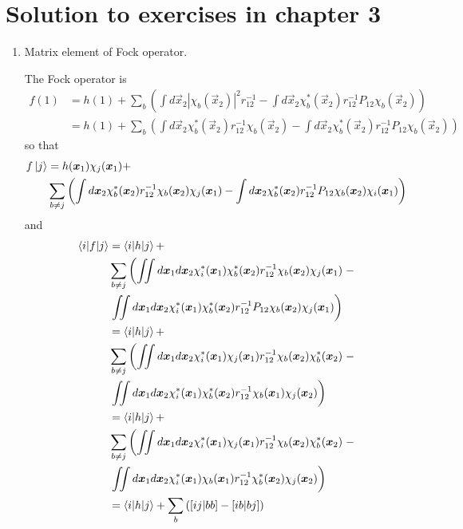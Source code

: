 \chapter{Solution to exercises in chapter 3}
\begin{enumerate}
\item\label{c3p1} Matrix element of Fock operator.

The Fock operator is
\[
\begin{aligned}
f(1) &= h(1) + \sum_b\left(\int d\vec{x}_2|\chi_b(\vec{x}_2)|^2 r_{12}^{-1} -
\int d\vec{x}_2\chi_b^\ast(\vec{x}_2)r_{12}^{-1}P_{12}\chi_b(\vec{x}_2)\right) \\
 &= h(1) + \sum_b\left(
\int d\vec{x}_2\chi_b^\ast(\vec{x}_2)r_{12}^{-1}\chi_b(\vec{x}_2) -
\int d\vec{x}_2\chi_b^\ast(\vec{x}_2)r_{12}^{-1}P_{12}\chi_b(\vec{x}_2)\right) 
\end{aligned}
\]
so that
\[
\begin{aligned}
f\ket{j} &= h(\bm{x}_1)\chi_j(\bm{x}_1) + \\
 & \sum_{b \ne j}\left(\int d\bm{x}_2
 \chi_b^\ast(\bm{x}_2)r_{12}^{-1}\chi_b(\bm{x}_2)\chi_j(\bm{x}_1) -
\int d\bm{x}_2\chi_b^\ast(\bm{x}_2)r_{12}^{-1}P_{12}\chi_b(\bm{x}_2)
\chi_i(\bm{x}_1) \right) 
\end{aligned}
\]
and
\[
\begin{aligned}
\braket{i|f|j} &= \braket{i|h|j} + \\
 & \sum_{b \ne j}\left(\iint d\bm{x}_1 d\bm{x}_2 \chi_i^\ast(\bm{x}_1)
 \chi_b^\ast(\bm{x}_2)r_{12}^{-1}\chi_b(\bm{x}_2)\chi_j(\bm{x}_1)\right. - \\
 & \left.
 \iint d\bm{x}_1 d\bm{x}_2
 \chi_i^\ast(\bm{x}_1)\chi_b^\ast(\bm{x}_2)r_{12}^{-1}P_{12}\chi_b(\bm{x}_2)
 \chi_j(\bm{x}_1) \right) \\
 &= \braket{i|h|j} + \\
 & \sum_{b \ne j}\left(\iint d\bm{x}_1 d\bm{x}_2 \chi_i^\ast(\bm{x}_1)
\chi_j(\bm{x}_1) r_{12}^{-1}\chi_b(\bm{x}_2)\chi_b^\ast(\bm{x}_2)\right. - \\
 & \left.
 \iint d\bm{x}_1 d\bm{x}_2
 \chi_i^\ast(\bm{x}_1)\chi_b^\ast(\bm{x}_2)r_{12}^{-1}\chi_b(\bm{x}_1)
 \chi_j(\bm{x}_2) \right) \\
 &= \braket{i|h|j} + \\
 & \sum_{b \ne j}\left(\iint d\bm{x}_1 d\bm{x}_2 \chi_i^\ast(\bm{x}_1)
\chi_j(\bm{x}_1) r_{12}^{-1}\chi_b(\bm{x}_2)\chi_b^\ast(\bm{x}_2)\right. - \\
 & \left.
 \iint d\bm{x}_1 d\bm{x}_2
 \chi_i^\ast(\bm{x}_1)\chi_b(\bm{x}_1)r_{12}^{-1}\chi_b^\ast(\bm{x}_2)
 \chi_j(\bm{x}_2) \right) \\
 &= \braket{i|h|j} + \sum_b\left([ij|bb] - [ib|bj]\right)
\end{aligned}
\]


\end{enumerate}
